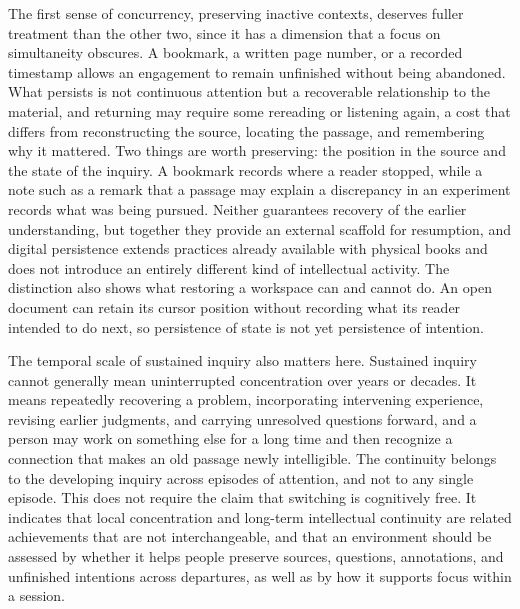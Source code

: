 \documentclass[12pt]{article}
\begin{document}
The first sense of concurrency, preserving inactive contexts, deserves fuller treatment than the other two, since it has a dimension that a focus on simultaneity obscures. A bookmark, a written page number, or a recorded timestamp allows an engagement to remain unfinished without being abandoned. What persists is not continuous attention but a recoverable relationship to the material, and returning may require some rereading or listening again, a cost that differs from reconstructing the source, locating the passage, and remembering why it mattered. Two things are worth preserving: the position in the source and the state of the inquiry. A bookmark records where a reader stopped, while a note such as a remark that a passage may explain a discrepancy in an experiment records what was being pursued. Neither guarantees recovery of the earlier understanding, but together they provide an external scaffold for resumption, and digital persistence extends practices already available with physical books and does not introduce an entirely different kind of intellectual activity. The distinction also shows what restoring a workspace can and cannot do. An open document can retain its cursor position without recording what its reader intended to do next, so persistence of state is not yet persistence of intention.

The temporal scale of sustained inquiry also matters here. Sustained inquiry cannot generally mean uninterrupted concentration over years or decades. It means repeatedly recovering a problem, incorporating intervening experience, revising earlier judgments, and carrying unresolved questions forward, and a person may work on something else for a long time and then recognize a connection that makes an old passage newly intelligible. The continuity belongs to the developing inquiry across episodes of attention, and not to any single episode. This does not require the claim that switching is cognitively free. It indicates that local concentration and long-term intellectual continuity are related achievements that are not interchangeable, and that an environment should be assessed by whether it helps people preserve sources, questions, annotations, and unfinished intentions across departures, as well as by how it supports focus within a session.
\end{document}
